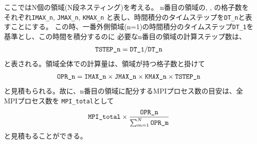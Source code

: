 ここではN個の領域(N段ネスティング)を考える。
n番目の領域の{\XDIR}, {\YDIR}, {\ZDIR}の格子数をそれぞれ\verb|IMAX_n|, \verb|JMAX_n|, \verb|KMAX_n|
と表し、時間積分のタイムステップを\verb|DT_n|と表すことにする。
この時、一番外側領域(n=1)の時間積分のタイムステップ\verb|DT_1|を基準とし、この時間を積分するのに
必要なn番目の領域の計算ステップ数は、
\begin{eqnarray}
 \verb|TSTEP_n| = \verb|DT_1| / \verb|DT_n|  \nonumber
\end{eqnarray}
と表される。領域全体での計算量は、領域が持つ格子数と掛けて
\begin{eqnarray}
 \verb|OPR_n| = \verb|IMAX_n| \times \verb|JMAX_n| \times \verb|KMAX_n| \times \verb|TSTEP_n| \nonumber
\end{eqnarray}
と見積もられる。故に、n番目の領域に配分するMPIプロセス数の目安は、全MPIプロセス数を \verb|MPI_total|として
\begin{eqnarray}
 \verb|MPI_total| \times \frac{ \texttt{OPR\_n} }{ \sum_{m=1}^N \texttt{OPR\_m} }
\end{eqnarray}
と見積もることができる。


